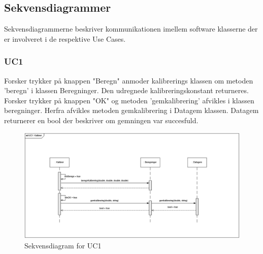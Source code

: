 \subsection{Sekvensdiagrammer}
Sekvensdiagrammerne beskriver kommunikationen imellem software klasserne der er involveret i de respektive Use Cases.\\

\subsubsection{UC1}
Forsker trykker på knappen "Beregn" anmoder kalibrerings klassen om metoden 'beregn' i klassen Beregninger. Den udregnede kalibreringskonstant returneres.\\
Forsker trykker på knappen "OK" og metoden 'gemkalibrering' afvikles i klassen beregninger. Herfra afvikles metoden gemkalibrering i Datagem klassen. Datagem returnerer en bool der beskriver om gemningen var succesfuld.
\begin{figure}[H]
	\centering
	\includegraphics[width=1\textwidth]{Figurer/UC1_SD_SW}
	\caption{Sekvensdiagram for UC1}
\end{figure}

